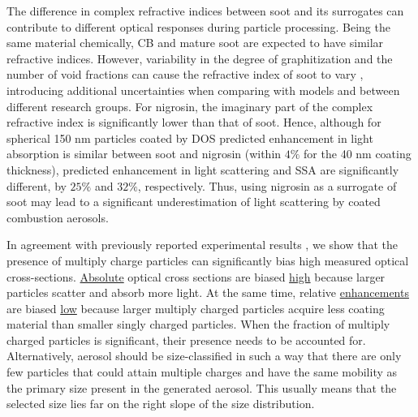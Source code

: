 The difference in complex refractive indices between soot and its surrogates can contribute to different optical responses during particle processing. Being the same material chemically, CB and mature soot are expected to have similar refractive indices. However, variability in the degree of graphitization and the number of void fractions can cause the refractive index of soot to vary \citep{RN72}, introducing additional uncertainties when comparing with models and between different research groups. For nigrosin, the imaginary part of the complex refractive index is significantly lower than that of soot. Hence, although for spherical 150 nm particles coated by DOS predicted enhancement in light absorption is similar between soot and nigrosin (within $4\%$ for the 40 nm coating thickness), predicted enhancement in light scattering and SSA are significantly different, by $25\%$ and $32\%$, respectively. Thus, using nigrosin as a surrogate of soot may lead to a significant underestimation of light scattering by coated combustion aerosols. 

In agreement with previously reported experimental results \citep{RN7,RN67}, we show that the presence of multiply charge particles can significantly bias high measured optical cross-sections. \underline{Absolute} optical cross sections are biased \underline{high} because larger particles scatter and absorb more light. At the same time, relative \underline{enhancements} are biased \underline{low} because larger multiply charged particles acquire less coating material than smaller singly charged particles. When the fraction of multiply charged particles is significant, their presence needs to be accounted for. Alternatively, aerosol should be size-classified in such a way that there are only few particles that could attain multiple charges and have the same mobility as the primary size present in the generated aerosol. This usually means that the selected size lies far on the right slope of the size distribution.


